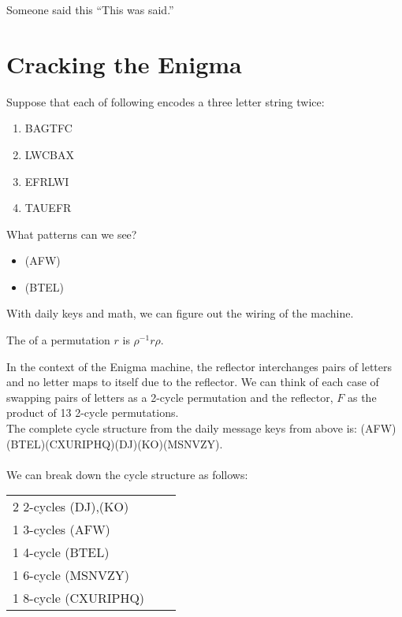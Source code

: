 
\begin{chapquote}{Someone said this}
``This was said.''
\end{chapquote}

\section{Cracking the Enigma}

\begin{example}

Suppose that each of following encodes a three letter string twice:

\begin{enumerate}
\item BAGTFC
\item LWCBAX
\item EFRLWI
\item TAUEFR
\end{enumerate}{}

What patterns can we see?
\begin{itemize}
\item (AFW)
\item (BTEL)
\end{itemize}{}


\end{example}


With daily keys and math, we can figure out the wiring of the machine.

\begin{definition} The  of a permutation $r$ is $\rho^{-1} r \rho$.
\end{definition}


In the context of the Enigma machine, the reflector interchanges pairs of letters and no letter maps to itself due to the reflector. We can think of each case of swapping pairs of letters as a 2-cycle permutation and the reflector, $F$ as the product of 13 2-cycle permutations. \\

The complete cycle structure from the daily message keys from above is: (AFW)(BTEL)(CXURIPHQ)(DJ)(KO)(MSNVZY). \\
\\We can break down the cycle structure as follows:

\begin{table}[h]
\begin{tabular}{lll}
 2  2-cycles (DJ),(KO)  \\
 1  3-cycles (AFW) \\
 1  4-cycle (BTEL) \\
 1  6-cycle (MSNVZY) \\
 1  8-cycle (CXURIPHQ)
\end{tabular}
\end{table}

